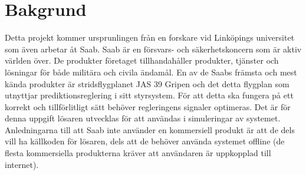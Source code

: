 \section{Bakgrund}    
Detta projekt kommer ursprunlingen från en forskare vid Linköpings universitet som även arbetar åt Saab. Saab är en försvars- och säkerhetskoncern som är aktiv världen över. De produkter företaget tillhandahåller produkter, tjänster och lösningar för både militära och civila ändamål. \citep{saabbrief}
\newline
\newline
En av de Saabs främsta och mest kända produkter är stridsflygplanet JAS 39 Gripen och det detta flygplan som utnyttjar prediktionsreglering i sitt styrsystem. För att detta ska fungera på ett korrekt och tillförlitligt sätt behöver regleringens signaler optimeras. Det är för denna uppgift lösaren utvecklas för att användas i simuleringar av systemet. 
\newline
\newline
Anledningarna till att Saab inte använder en kommersiell produkt är att de dels vill ha källkoden för lösaren, dels att de behöver använda systemet offline (de flesta kommersiella produkterna kräver att användaren är uppkopplad till internet).  